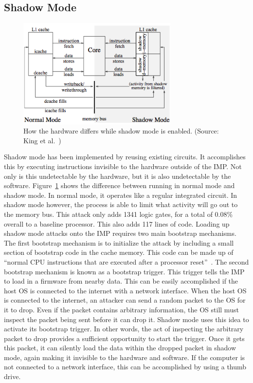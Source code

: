 \documentclass[letterpaper,twocolumn,11pt]{article}
\begin{document}
\subsection{Shadow Mode}
\begin{figure}[ht!]
\centering
\includegraphics[width=80mm]{images/shadow.png}
\caption{How the hardware differs while shadow mode is enabled. (Source: King et al.~\cite {king})}
\label{shadow}
\end{figure}

Shadow mode has been implemented by reusing existing circuits. It accomplishes this by executing instructions invisible to the hardware outside of the IMP. Not only is this undetectable by the hardware, but it is also undetectable by the software. Figure~\ref{shadow} shows the difference between running in normal mode and shadow mode. In normal mode, it operates like a regular integrated circuit. In shadow mode however, the process is able to limit what activity will go out to the memory bus. This attack only adds 1341 logic gates, for a total of 0.08\% overall to a baseline processor. This also adds 117 lines of code. Loading up shadow mode attacks onto the IMP requires two main bootstrap mechanisms. \\

The first bootstrap mechanism is to initialize the attack by including a small section of bootstrap code in the cache memory. This code can be made up of ``normal CPU instructions that are executed after a processor reset''~\cite {king}. The second bootstrap mechanism is known as a bootstrap trigger. This trigger tells the IMP to load in a firmware from nearby data. This can be easily accomplished if the host OS is connected to the internet with a network interface. When the host OS is connected to the internet, an attacker can send a random packet to the OS for it to drop. Even if the packet contains arbitrary information, the OS still must inspect the packet being sent before it can drop it. Shadow mode uses this idea to activate its bootstrap trigger. In other words, the act of inspecting the arbitrary packet to drop provides a sufficient opportunity to start the trigger. Once it gets this packet, it can silently load the data within the dropped packet in shadow mode, again making it invisible to the hardware and software. If the computer is not connected to a network interface, this can be accomplished by using a thumb drive. \\
\end{document}
